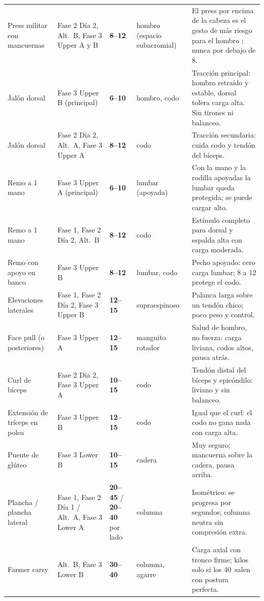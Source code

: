 \documentclass[11pt,a4paper]{article}
\newcommand{\rango}[1]{\textbf{#1}}
\newcommand{\seg}{\textquotedbl}
\begin{document}
\begin{longtable}{L{3.0cm} L{3.0cm} L{2.1cm} L{2.0cm} L{4.8cm}}
Press militar con mancuernas & Fase 2 Día 2, Alt.\ B, Fase 3 Upper A y B & \rango{8--12} & hombro (espacio subacromial) & El press por encima de la cabeza es el gesto de más riesgo para el hombro \cite{kolber2010}; nunca por debajo de 8. \\
Jalón dorsal & Fase 3 Upper B (principal) & \rango{6--10} & hombro, codo & Tracción principal: hombro retraído y estable, dorsal tolera carga alta. Sin tirones ni balanceo. \\
Jalón dorsal & Fase 2 Día 2, Alt.\ A, Fase 3 Upper A & \rango{8--12} & codo & Tracción secundaria: cuida codo y tendón del bíceps. \\
Remo a 1 mano & Fase 3 Upper A (principal) & \rango{6--10} & lumbar (apoyada) & Con la mano y la rodilla apoyadas la lumbar queda protegida; se puede cargar alto. \\
Remo a 1 mano & Fase 1, Fase 2 Día 2, Alt.\ B & \rango{8--12} & codo & Estímulo completo para dorsal y espalda alta con carga moderada. \\
Remo con apoyo en banco & Fase 3 Upper B & \rango{8--12} & lumbar, codo & Pecho apoyado: cero carga lumbar; 8 a 12 protege el codo. \\
Elevaciones laterales & Fase 1, Fase 2 Día 2, Fase 3 Upper B & \rango{12--15} & supra\-espinoso & Palanca larga sobre un tendón chico; poco peso y control. \\
Face pull (o posteriores) & Fase 3 Upper A & \rango{12--15} & manguito rotador & Salud de hombro, no fuerza: carga liviana, codos altos, pausa atrás. \\
Curl de bíceps & Fase 2 Día 2, Fase 3 Upper A & \rango{10--15} & codo & Tendón distal del bíceps y epicóndilo: liviano y sin balanceo. \\
Extensión de tríceps en polea & Fase 3 Upper B & \rango{12--15} & codo & Igual que el curl: el codo no gana nada con carga alta. \\
Puente de glúteo & Fase 3 Lower B & \rango{10--15} & cadera & Muy seguro; mancuerna sobre la cadera, pausa arriba. \\
Plancha / plancha lateral & Fase 1, Fase 2 Día 1 / Alt.\ A, Fase 3 Lower A & \rango{20--45\seg} / \rango{20--40\seg} por lado & columna & Isométrico: se progresa por segundos; columna neutra sin compresión extra. \\
Farmer carry & Alt.\ B, Fase 3 Lower B & \rango{30--40\seg} & columna, agarre & Carga axial con tronco firme; kilos solo si los 40\seg\ salen con postura perfecta. \\
\bottomrule
\end{longtable}
\end{document}
